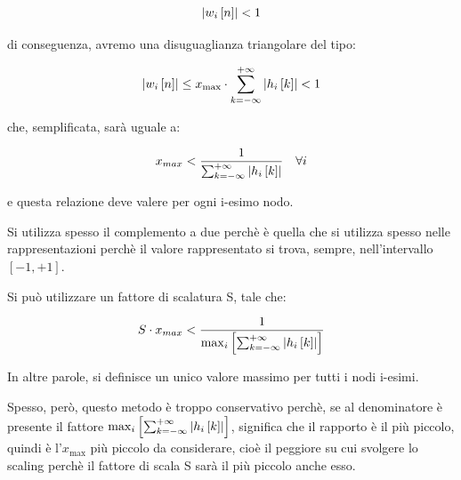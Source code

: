 {
    \Large 
    \begin{equation}
        \abs{w_i \left[ n\right]} < 1
    \end{equation}
}

di conseguenza, avremo una disuguaglianza triangolare del tipo:

{
    \Large 
    \begin{equation}
       \abs{w_{i} \left[ n\right]} 
        \leq 
        x_{\text{max}} 
        \cdot
        \sum_{k = -\infty}^{+ \infty} 
        \abs{h_{i} \left[ k\right]}    
        < 
        1  
    \end{equation}
}

che, semplificata, sarà uguale a: 

{
    \Large 
    \begin{equation}
        x_{max} < \dfrac{1}{\sum_{k = -\infty}^{+ \infty} \abs{h_{i} \left[ k\right]}} 
        \quad 
        \forall i
    \end{equation}
}

e questa relazione deve valere per ogni i-esimo nodo. \newline 

\begin{tcolorbox}
Si utilizza spesso il complemento a due perchè è quella che si utilizza spesso nelle rappresentazioni perchè il valore rappresentato si trova, sempre, nell'intervallo $\left[ -1, +1\right]$.     
\end{tcolorbox}

Si può utilizzare un fattore di scalatura S, tale che: 

{
    \Large 
    \begin{equation}
        S \cdot x_{max}
        < 
        \dfrac{1}{
            \max_{i} \left[ \sum_{k = - \infty}^{+ \infty} \abs{h_{i} \left[ k\right]}\right]
        }
    \end{equation}
}

In altre parole, si definisce un unico valore massimo per tutti i nodi i-esimi. \newline 

Spesso, però, questo metodo è troppo conservativo perchè, se al denominatore è presente il fattore $\max_{i} \left[ \sum_{k = - \infty}^{+ \infty} \abs{h_{i} \left[ k\right]}\right]$, 
significa che il rapporto è il più piccolo, quindi è l'$x_{\text{max}}$ più piccolo da considerare, cioè il peggiore su cui svolgere lo scaling perchè il fattore di scala S sarà il più piccolo anche esso. \newline 

